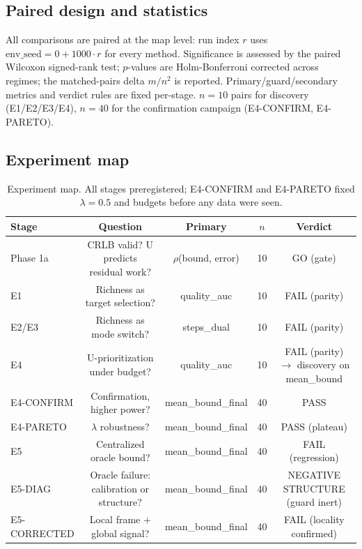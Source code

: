 \documentclass[journal]{IEEEtran}
\begin{document}
\subsection{Paired design and statistics}
All comparisons are paired at the map level: run index $r$ uses
$\mathrm{env\_seed} = 0 + 1000 \cdot r$ for every method. Significance is
assessed by the paired Wilcoxon signed-rank test; $p$-values are
Holm-Bonferroni corrected across regimes; the matched-pairs delta $m/n^2$ is
reported. Primary/guard/secondary metrics and verdict rules are fixed
per-stage. $n = 10$ pairs for discovery (E1/E2/E3/E4), $n = 40$ for the
confirmation campaign (E4-CONFIRM, E4-PARETO).

\subsection{Experiment map}

\begin{table}[t]
\caption{Experiment map. All stages preregistered; E4-CONFIRM and E4-PARETO fixed $\lambda = 0.5$ and budgets before any data were seen.}
\label{tab:map}
\centering
\begin{tabular}{l c c c c}
\toprule
Stage & Question & Primary & $n$ & Verdict \\
\midrule
Phase 1a & CRLB valid? U predicts residual work? & $\rho$(bound, error) & 10 & GO (gate) \\
E1 & Richness as target selection? & quality\_auc & 10 & FAIL (parity) \\
E2/E3 & Richness as mode switch? & steps\_dual & 10 & FAIL (parity) \\
E4 & U-prioritization under budget? & quality\_auc & 10 & FAIL (parity) $\rightarrow$ discovery on mean\_bound \\
E4-CONFIRM & Confirmation, higher power? & mean\_bound\_final & 40 & PASS \\
E4-PARETO & $\lambda$ robustness? & mean\_bound\_final & 40 & PASS (plateau) \\
E5 & Centralized oracle bound? & mean\_bound\_final & 40 & FAIL (regression) \\
E5-DIAG & Oracle failure: calibration or structure? & mean\_bound\_final & 40 & NEGATIVE STRUCTURE (guard inert) \\
E5-CORRECTED & Local frame + global signal? & mean\_bound\_final & 40 & FAIL (locality confirmed) \\
\bottomrule
\end{tabular}
\end{table}
\end{document}
